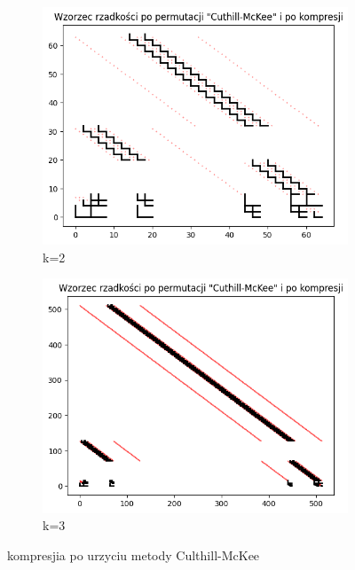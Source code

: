 \documentclass{article}
\begin{document}
\FloatBarrier
\begin{figure}[htbp]
  \centering
  \begin{subfigure}[b]{0.4\textwidth}
      \includegraphics[width=\linewidth]{img/2d2k2.png}
      \caption{k=2}
      \label{fig:obraz1}
  \end{subfigure}
  \hfill
  \begin{subfigure}[b]{0.4\textwidth}
      \includegraphics[width=\linewidth]{img/2d2k3.png}
      \caption{k=3}
      \label{fig:obraz2}
  \end{subfigure}
  \caption{kompresjia po urzyciu metody Culthill-McKee}
  \label{fig:zestaw_obrazkow}
\end{figure}
\end{document}
